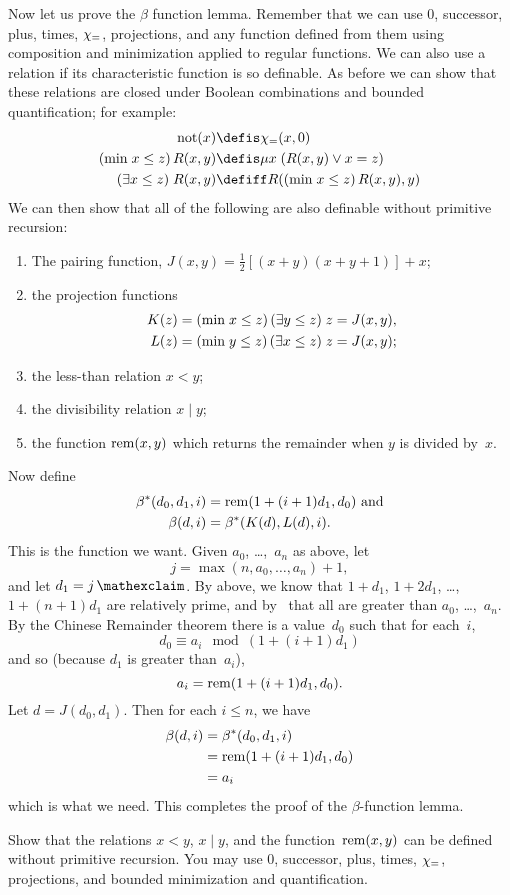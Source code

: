 \documentclass[../../../include/open-logic-section]{subfiles}
\begin{document}
Now let us prove the $\beta$ function lemma. Remember that we can use
$0$, successor, plus, times, $\chi_{=}$, projections, and any function
defined from them using composition and minimization applied to
regular functions. We can also use a relation if its characteristic
function is so definable. As before we can show that these relations
are closed under Boolean combinations and bounded quantification; for
example:
\begin{align*}
\fn{not}(x) & \defis \Char{=}(x,0)\\
\bmin{x \leq z}{R(x,y)} & \defis \umin{x}{(R(x,y) \lor x = z)}\\
\bexists{x \leq z}{R(x,y)} & \defiff R(\bmin{x \leq z}{R(x,y)}, y)
\end{align*}
We can then show that all of the following are also definable without
primitive recursion:
\begin{enumerate}
\item The pairing function, $J(x,y) = \frac{1}{2}[(x+y)(x+y+1)] + x$;
\item the projection functions
\begin{align*}
K(z) & = (\mathrm{min} \; x \leq z)\, (\exists y \leq z)\; z = J(x,y),\\
L(z) & = (\mathrm{min} \; y \leq z)\, (\exists x \leq z)\; z = J(x,y);
\end{align*}
\item the less-than relation $x < y$;
\item the divisibility relation $x \mid y$;
\item the function $\mathrm{rem}(x,y)$ which returns the remainder when
  $y$ is divided by~$x$.
\end{enumerate}
Now define
\begin{align*}
\beta^*(d_0,d_1,i) & = \mathrm{rem}(1+(i+1) d_1,d_0) \text{ and}\\
\beta(d,i) & = \beta^*(K(d),L(d),i).
\end{align*}
This is the function we want. Given $a_0$, \dots,~$a_n$ as above, let
\[
j = \max(n,a_0,\dots,a_n)+1,
\]
and let $d_1 = \fact{j}$. By  above, we know that
$1+d_1$, $1+2 d_1$, \dots, $1+(n+1) d_1$ are relatively prime, and
by~ that all are greater than $a_0$, \dots,~$a_n$. By the
Chinese Remainder theorem there is a value~$d_0$ such that for
each~$i$,
\[
d_0 \equiv a_i \mod (1+(i+1)d_1)
\]
and so (because $d_1$ is greater than~$a_i$),
\[
a_i = \mathrm{rem}(1+(i+1)d_1,d_0).
\]
Let $d = J(d_0,d_1)$. Then for each $i \le n$, we have
\begin{align*}
\beta(d,i) & =  \beta^*(d_0,d_1,i) \\
& =  \mathrm{rem}(1+(i+1) d_1,d_0) \\
& =  a_i
\end{align*}
which is what we need. This completes the proof of the
$\beta$-function lemma.

\begin{prob}
  Show that the relations $x < y$, $x \mid y$, and the
  function~$\mathrm{rem}(x,y)$ can be defined without primitive recursion.
  You may use $0$, successor, plus, times, $\chi_{=}$, projections,
  and bounded minimization and quantification.
\end{prob}
\end{document}
